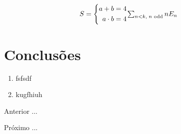 





\begin{equation}
S = \left\{
\begin{aligned}
  a + b     &= 4\\
  a \cdot b &= 4
\end{aligned}
\right.
$$ $$%
\sum_{n<k,\;\text{$n$ odd}} nE_n
 \label{1}
\end{equation}


\section{Conclusões}


\begin{enumerate}[label=\Roman{*}, ref=(\roman{*})]
  \item fsfsdf
  \item kugfhiuh
\end{enumerate}

\begin{asparaenum}
\item Anterior ... \cite{ninguem2022curioso}
\item Próximo ... \label{pl1}
\end{asparaenum}









